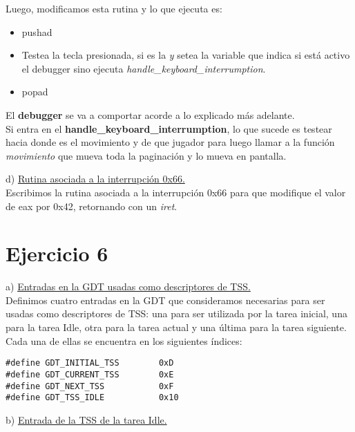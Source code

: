 \documentclass[a4paper]{article}
\begin{document}
Luego, modificamos esta rutina y lo que ejecuta es:
\begin{itemize}
\item pushad
\item Testea la tecla presionada, si es la \emph{y} setea la variable que indica si est\'a activo el debugger sino ejecuta \textit{handle_keyboard_interrumption}.
\item popad
\end{itemize}

El \textbf{debugger} se va a comportar acorde a lo explicado m\'as adelante.\\

Si entra en el \textbf{handle_keyboard_interrumption}, lo que sucede es testear hacia donde es el movimiento y de que jugador para luego llamar a la funci\'on \textit{movimiento} que mueva toda la paginaci\'on y lo mueva en pantalla.
\bigskip

{\large d)} \underline{Rutina asociada a la interrupci\'on 0x66.}\\


Escribimos la rutina asociada a la interrupci\'on 0x66 para que modifique el valor de eax por
0x42, retornando con un \textit{iret}. 

\newpage
\section{Ejercicio 6}
{\large a)} \underline{Entradas en la GDT usadas como descriptores de TSS.}\\

Definimos cuatro entradas en la GDT que consideramos necesarias para ser usadas como descriptores
de TSS: una para ser utilizada por la tarea inicial, una para la tarea Idle, otra para la tarea actual y una \'ultima para la tarea siguiente.\\

Cada una de ellas se encuentra en los siguientes \'indices: 
\begin{codesnippet}
\begin{verbatim}
#define GDT_INITIAL_TSS        0xD
#define GDT_CURRENT_TSS        0xE
#define GDT_NEXT_TSS           0xF
#define GDT_TSS_IDLE           0x10
\end{verbatim}
\end{codesnippet}
\bigskip



{\large b)} \underline{Entrada de la TSS de la tarea Idle.}\\
\end{document}
